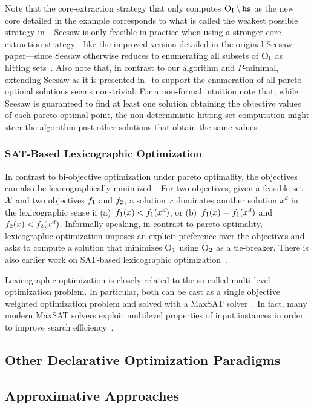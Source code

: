 Note that the core-extraction strategy that only computes $\textsc{O}_{\text{I}} \setminus \texttt{hs}$ as the new core detailed in the example corresponds to what is called the weakest possible strategy in~\textcite{DBLP:conf/cp/JanotaMSM21}.
Seesaw is only feasible in practice when using a stronger core-extraction strategy---like the improved version detailed in the original Seesaw paper---since Seesaw otherwise reduces to enumerating all subsets of $\textsc{O}_{\text{I}}$ as hitting sets~\autocite{DBLP:conf/cp/JanotaMSM21}.
Also note that, in contrast to our algorithm and $P$-minimal, extending Seesaw as it is presented in~\textcite{DBLP:conf/cp/JanotaMSM21} to support the enumeration of all pareto-optimal solutions seems non-trivial.
For a non-formal intuition note that, while Seesaw is guaranteed to find at least one solution obtaining the objective values of each pareto-optimal point, the non-deterministic hitting set computation might steer the algorithm past other solutions that obtain the same values.

\subsubsection{SAT-Based Lexicographic Optimization\label{sec:lex-opt}}

In contrast to bi-objective optimization under pareto optimality, the objectives can also be lexicographically minimized~\autocite{Ehrgott2005-1}.
For two objectives, given a feasible set $\mathcal{X}$ and two objectives $f_1$ and $f_2$, a solution $x$ dominates another solution $x^d$ in the lexicographic sense if (a)~$f_1(x) < f_1(x^d)$, or (b)~$f_1(x) = f_1(x^d)$ and $f_2(x) < f_2(x^d)$.
Informally speaking, in contrast to pareto-optimality, lexicographic optimization imposes an explicit preference over the objectives and asks to compute a solution that minimizes $\textsc{O}_1$ using $\textsc{O}_2$ as a tie-breaker.
There is also earlier work on SAT-based lexicographic optimization~\autocite{DBLP:journals/ors/EhrgottG00,DBLP:conf/ijcai/ArgelichLS09,DBLP:journals/amai/Marques-SilvaAGL11}. 

Lexicographic optimization is closely related to the so-called multi-level optimization problem.
In particular, both can be cast as a single objective weighted optimization problem and solved with a MaxSAT solver~\autocite{DBLP:conf/ijcai/ArgelichLS09,DBLP:journals/amai/Marques-SilvaAGL11}.
In fact, many modern MaxSAT solvers exploit  multilevel properties of input instances in order to improve search efficiency~\autocite{DBLP:conf/vmcai/PaxianRB21,DBLP:conf/cp/AnsoteguiBGL12}.

\subsection{Other Declarative Optimization Paradigms\label{sec:other-approaches}}

\subsection{Approximative Approaches\label{sec:approximative}}
